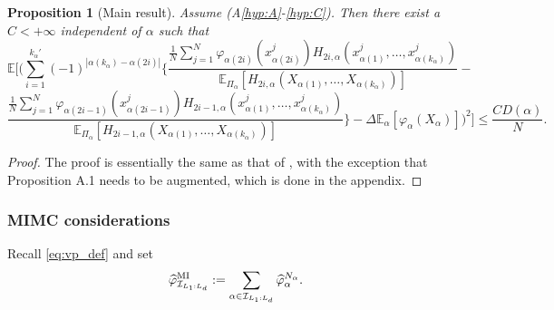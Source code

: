 \documentclass[english]{article}
\newtheorem{prop}{Proposition}[section]
\newcommand{\cI}{{\cal I}}
\begin{document}
\begin{prop}[Main result]
\label{prop:main_res}
Assume (A\ref{hyp:A}-\ref{hyp:C}). Then %
there exist a $C<+\infty$ independent of $\alpha$ such that
$$
\mathbb{E}\Bigg[\Bigg(
\sum_{i=1}^{k_{\alpha}'}(-1)^{|\alpha(k_{\alpha})-\alpha(2i)|}
\Bigg\{
\frac{
\frac{1}{N}\sum_{j=1}^N
\varphi_{\alpha(2i)}(x^j_{\alpha(2i)})
H_{2i,\alpha}(x^j_{\alpha(1)},\dots,x^j_{\alpha(k_{\alpha})})
}
{
\mathbb{E}_{\Pi_{\alpha}}[H_{2i,\alpha}(X_{\alpha(1)},\dots,X_{\alpha(k_{\alpha})})]
} -
$$
$$
\frac{
\frac{1}{N}\sum_{j=1}^N
\varphi_{\alpha(2i-1)}(x^j_{\alpha(2i-1)})
H_{2i-1,\alpha}(x^j_{\alpha(1)},\dots,x^j_{\alpha(k_{\alpha})})
}
{
\mathbb{E}_{\Pi_{\alpha}}[H_{2i-1,\alpha}(X_{\alpha(1)},\dots,X_{\alpha(k_{\alpha})})]
} 
\Bigg\}
- \Delta \mathbb{E}_{\alpha}[\varphi_{\alpha}(X_{\alpha})]\Bigg)^2
\Big]
%
\leq 
\frac{C D(\alpha)}{N}.
$$
\end{prop}
\begin{proof}
The proof is essentially the same as that of \cite[Theorem 3.1]{jasra}, 
with the exception that Proposition A.1 needs to be augmented, which is done in the appendix. %
\end{proof}





\subsubsection{MIMC considerations}


Recall \eqref{eq:vp_def} and set
\begin{equation}\label{eq:mimcmcest}
\widehat{\varphi}_{\cI_{ L_1:L_d}}^{\rm MI} := \sum_{\alpha\in \cI_{ L_1:L_d}} \widehat{\varphi}^{N_\alpha}_\alpha .
\end{equation}
\end{document}
